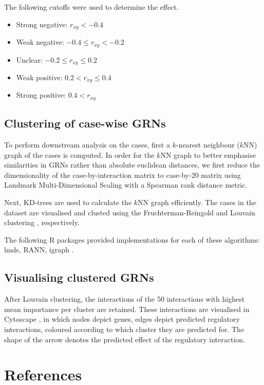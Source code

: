 The following cutoffs were used to determine the effect. 

\begin{itemize}
	\item Strong negative: $r_{xy} < -0.4$
  \item Weak negative: $-0.4 \leq r_{xy} < -0.2$
  \item Unclear: $-0.2 \leq r_{xy} \leq 0.2$
  \item Weak positive: $0.2 < r_{xy} \leq 0.4$
  \item Strong positive: $0.4 < r_{xy}$
\end{itemize} 

\subsection{Clustering of case-wise GRNs}
To perform downstream analysis on the cases, first a $k$-nearest neighbour ($k$NN) graph of the cases is computed.
In order for the $k$NN graph to better emphasise similarities in GRNs rather than absolute euclidean distances, we first reduce the dimensionality of the case-by-interaction matrix to case-by-20 matrix using Landmark Multi-Dimensional Scaling \cite{lee_landmarkmdsensemble_2009} with a Spearman rank distance metric.  

Next, KD-trees are used to calculate the $k$NN graph efficiently. The cases in the dataset are visualised and clusted using the Fruchterman-Reingold \cite{fruchterman_graphdrawingforcedirected_1991} and Louvain clustering \cite{blondel_fastunfoldingcommunities_2008}, respectively.

The following R packages provided implementations for each of these algorithms: lmds, RANN, igraph \cite{csardi_igraphsoftwarepackage_2006}.

\subsection{Visualising clustered GRNs}
After Louvain clustering, the interactions of the 50 interactions with highest mean importance per cluster are retained. These interactions are visualised in Cytoscape \cite{shannon_cytoscapesoftwareenvironment_2003}, in which nodes depict genes, edges depict predicted regulatory interactions, coloured according to which cluster they are predicted for. The shape of the arrow denotes the predicted effect of the regulatory interaction.

%

\clearpage
\section{References}
\printbibliography[heading=none]
